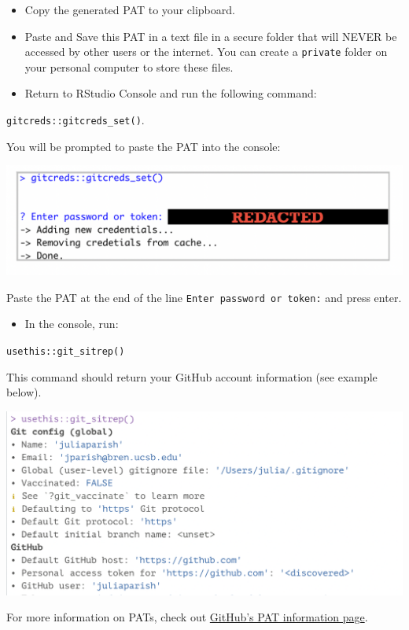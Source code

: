 \documentclass[
]{book}
\providecommand{\tightlist}{%
  \setlength{\itemsep}{0pt}\setlength{\parskip}{0pt}}
\begin{document}
\begin{itemize}
\item
  Copy the generated PAT to your clipboard.
\item
  Paste and Save this PAT in a text file in a secure folder that will NEVER be accessed by other users or the internet. You can create a \texttt{private} folder on your personal computer to store these files.
\item
  Return to RStudio Console and run the following command:
\end{itemize}

\texttt{gitcreds::gitcreds\_set()}.

You will be prompted to paste the PAT into the console:

\begin{center}\includegraphics[width=0.8\linewidth]{images/paste_pat} \end{center}

Paste the PAT at the end of the line \texttt{Enter\ password\ or\ token:} and press enter.

\begin{itemize}
\tightlist
\item
  In the console, run:
\end{itemize}

\texttt{usethis::git\_sitrep()}

This command should return your GitHub account information (see example below).

\begin{center}\includegraphics[width=0.8\linewidth]{images/gitsitrep} \end{center}

For more information on PATs, check out \href{https://docs.github.com/en/authentication/keeping-your-account-and-data-secure/creating-a-personal-access-token}{GitHub's PAT information page}.
\end{document}
